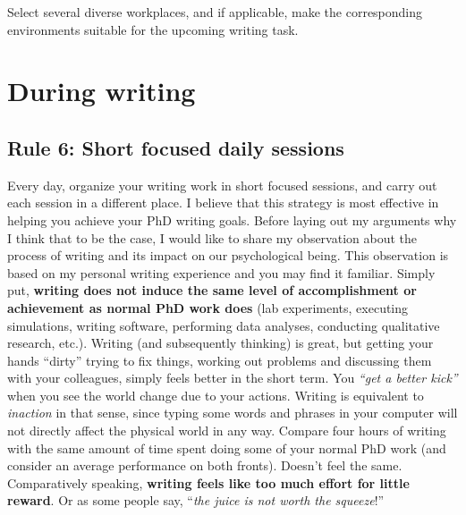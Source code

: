 \documentclass[
  12pt,
]{book}
\begin{document}
Select several diverse workplaces, and if applicable, make the corresponding environments suitable for the upcoming writing task.

\hypertarget{during}{%
\chapter*{During writing}\label{during}}

\hypertarget{rule6}{%
\section*{\texorpdfstring{\textbf{Rule 6:} Short focused daily sessions}{Rule 6: Short focused daily sessions}}\label{rule6}}

Every day, organize your writing work in short focused sessions, and carry out each session in a different place.
I believe that this strategy is most effective in helping you achieve your PhD writing goals.
Before laying out my arguments why I think that to be the case, I would like to share my observation about the process of writing and its impact on our psychological being.
This observation is based on my personal writing experience and you may find it familiar.
Simply put, \textbf{writing does not induce the same level of accomplishment or achievement as normal PhD work does} (lab experiments, executing simulations, writing software, performing data analyses, conducting qualitative research, etc.).
Writing (and subsequently thinking) is great, but getting your hands ``dirty'' trying to fix things, working out problems and discussing them with your colleagues, simply feels better in the short term.
You \emph{``get a better kick''} when you see the world change due to your actions.
Writing is equivalent to \emph{inaction} in that sense, since typing some words and phrases in your computer will not directly affect the physical world in any way.
Compare four hours of writing with the same amount of time spent doing some of your normal PhD work (and consider an average performance on both fronts).
Doesn't feel the same.
Comparatively speaking, \textbf{writing feels like too much effort for little reward}.
Or as some people say, ``\emph{the juice is not worth the squeeze}!''
\end{document}
